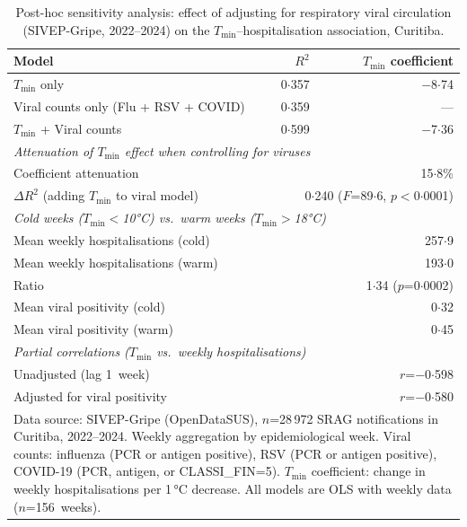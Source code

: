 \documentclass[12pt]{article}
\begin{document}

\begin{table}[ht]
\centering
\caption{Post-hoc sensitivity analysis: effect of adjusting for
respiratory viral circulation (SIVEP-Gripe, 2022--2024) on the
$T_\mathrm{min}$--hospitalisation association, Curitiba.}
\label{etab:viral_sensitivity}
\begin{tabular}{lrr}
\toprule
Model & $R^2$ & $T_\mathrm{min}$ coefficient \\
\midrule
$T_\mathrm{min}$ only & 0${\cdot}$357 & $-$8${\cdot}$74 \\
Viral counts only (Flu + RSV + COVID) & 0${\cdot}$359 & --- \\
$T_\mathrm{min}$ + Viral counts & 0${\cdot}$599 & $-$7${\cdot}$36 \\
\midrule
\multicolumn{3}{l}{\textit{Attenuation of $T_\mathrm{min}$ effect when controlling for viruses}} \\
Coefficient attenuation & \multicolumn{2}{r}{15${\cdot}$8\%} \\
$\Delta R^2$ (adding $T_\mathrm{min}$ to viral model) & \multicolumn{2}{r}{0${\cdot}$240 ($F$=89${\cdot}$6, $p$$<$0${\cdot}$0001)} \\
\midrule
\multicolumn{3}{l}{\textit{Cold weeks ($T_\mathrm{min}$$<$10°C) vs.\ warm weeks ($T_\mathrm{min}$$>$18°C)}} \\
Mean weekly hospitalisations (cold) & \multicolumn{2}{r}{257${\cdot}$9} \\
Mean weekly hospitalisations (warm) & \multicolumn{2}{r}{193${\cdot}$0} \\
Ratio & \multicolumn{2}{r}{1${\cdot}$34 ($p$=0${\cdot}$0002)} \\
Mean viral positivity (cold) & \multicolumn{2}{r}{0${\cdot}$32} \\
Mean viral positivity (warm) & \multicolumn{2}{r}{0${\cdot}$45} \\
\midrule
\multicolumn{3}{l}{\textit{Partial correlations ($T_\mathrm{min}$ vs.\ weekly hospitalisations)}} \\
Unadjusted (lag 1~week) & \multicolumn{2}{r}{$r$=$-$0${\cdot}$598} \\
Adjusted for viral positivity & \multicolumn{2}{r}{$r$=$-$0${\cdot}$580} \\
\bottomrule
\multicolumn{3}{p{0.9\textwidth}}{\footnotesize
Data source: SIVEP-Gripe (OpenDataSUS), $n$=28\,972 SRAG
notifications in Curitiba, 2022--2024. Weekly aggregation by
epidemiological week. Viral counts: influenza (PCR or antigen
positive), RSV (PCR or antigen positive), COVID-19 (PCR, antigen,
or CLASSI\_FIN=5). $T_\mathrm{min}$ coefficient: change in weekly
hospitalisations per 1\,°C decrease. All models are OLS with weekly
data ($n$=156~weeks).}
\end{tabular}
\end{table}
\end{document}
